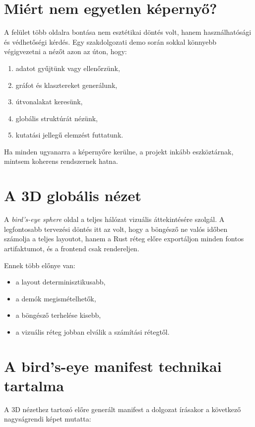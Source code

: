 \documentclass[a4paper,12pt]{report}
\begin{document}
\section{Miért nem egyetlen képernyő?}

A felület több oldalra bontása nem esztétikai döntés volt, hanem használhatósági és védhetőségi kérdés. Egy szakdolgozati demo során sokkal könnyebb végigvezetni a nézőt azon az úton, hogy:

\begin{enumerate}
    \item adatot gyűjtünk vagy ellenőrzünk,
    \item gráfot és klasztereket generálunk,
    \item útvonalakat keresünk,
    \item globális struktúrát nézünk,
    \item kutatási jellegű elemzést futtatunk.
\end{enumerate}

Ha minden ugyanarra a képernyőre kerülne, a projekt inkább eszköztárnak, mintsem koherens rendszernek hatna.

\section{A 3D globális nézet}

A \emph{bird's-eye sphere} oldal a teljes hálózat vizuális áttekintésére szolgál. A legfontosabb tervezési döntés itt az volt, hogy a böngésző ne valós időben számolja a teljes layoutot, hanem a Rust réteg előre exportáljon minden fontos artifaktumot, és a frontend csak rendereljen.

Ennek több előnye van:

\begin{itemize}
    \item a layout determinisztikusabb,
    \item a demók megismételhetők,
    \item a böngésző terhelése kisebb,
    \item a vizuális réteg jobban elválik a számítási rétegtől.
\end{itemize}

\section{A bird's-eye manifest technikai tartalma}

A 3D nézethez tartozó előre generált manifest a dolgozat írásakor a következő nagyságrendi képet mutatta:
\end{document}
